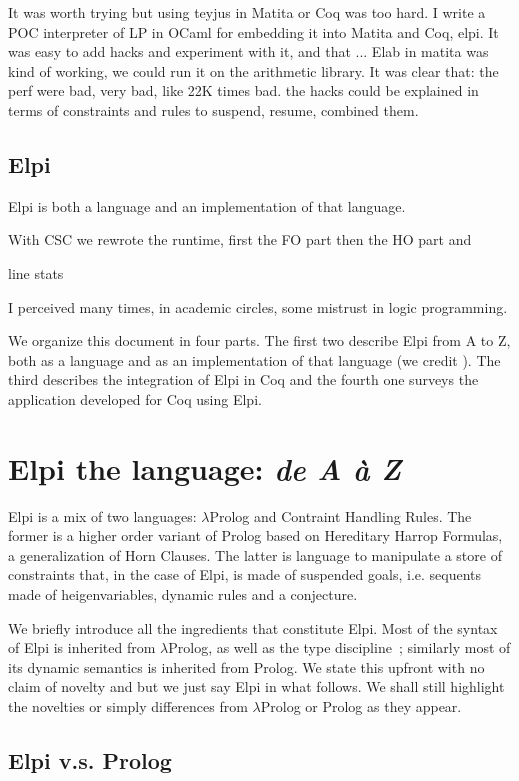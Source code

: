 \documentclass[a4paper, 11pt]{book}
\begin{document}
It was worth trying but using teyjus in Matita or Coq was too hard.
I write a POC interpreter of LP in OCaml for embedding it into
Matita and Coq, elpi. It was easy to add hacks and experiment with
it, and that ... Elab in matita was kind of working, we could run
it on the arithmetic library. It was clear that:
the perf were bad, very bad, like 22K times bad.
the hacks could be explained in terms of constraints and rules to
suspend, resume, combined them.


\section{Elpi}
Elpi is both a language and an implementation of that language.

With CSC we rewrote the runtime, first the FO part then the HO part
and 

line stats

I perceived many times, in academic circles, some mistrust in logic programming.


We organize this document in four parts. The first two describe Elpi from
A to Z, both as a language and as an implementation of that language (we credit
\cite{ridoux1998lambda}). The third describes the integration of Elpi in Coq
and the fourth one surveys the application developed for Coq using Elpi.


\chapter{Elpi the language: \emph{de A \`a Z}}

Elpi is a mix of two languages: $\lambda$Prolog and Contraint Handling Rules.
The former is a higher order variant of Prolog based on
Hereditary Harrop Formulas, a generalization of Horn Clauses.
The latter is language to manipulate a store of constraints that,
in the case of Elpi, is made of suspended goals, i.e. sequents
made of heigenvariables, dynamic rules and a conjecture.

We briefly introduce all the ingredients that constitute Elpi.
Most of the syntax of Elpi is inherited from $\lambda$Prolog, as well
as the type discipline~\cite{Miller_Nadathur_2012}; similarly most of
its dynamic semantics is inherited from Prolog.
We state this upfront with no claim of novelty and but we just say Elpi in what
follows. We shall still highlight the novelties or simply differences from
$\lambda$Prolog or Prolog as they appear.

\section{Elpi v.s. Prolog}
\end{document}
